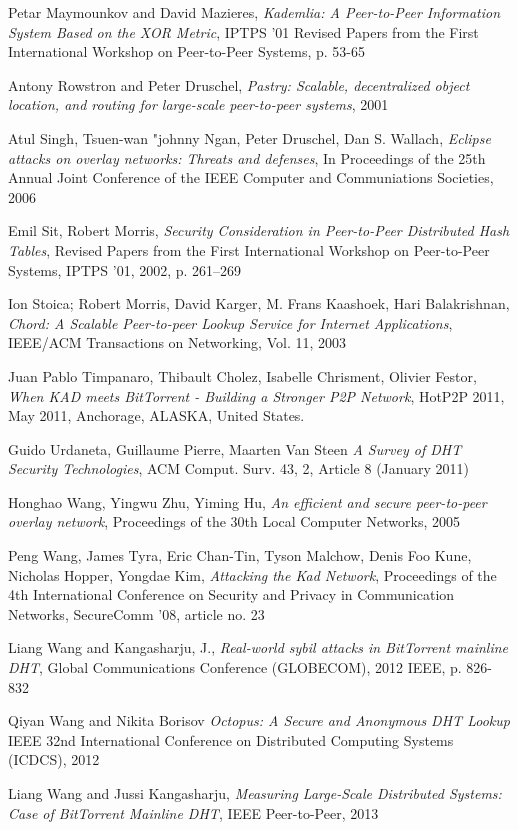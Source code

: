 \begin{thebibliography}{99}
  Petar Maymounkov and David Mazieres,
  \textit{Kademlia: A Peer-to-Peer Information System Based on the XOR Metric},
  IPTPS '01 Revised Papers from the First International Workshop on Peer-to-Peer
  Systems, p. 53-65

  Antony Rowstron and Peter Druschel,
  \textit{Pastry: Scalable, decentralized object location, and routing for
  large-scale peer-to-peer systems}, 2001

  Atul Singh, Tsuen-wan "johnny Ngan, Peter Druschel, Dan S. Wallach,
  \textit{Eclipse attacks on overlay networks: Threats and defenses},
  In Proceedings of the 25th Annual Joint Conference of the IEEE Computer and
  Communiations Societies, 2006

  Emil Sit, Robert Morris,
  \textit{Security Consideration in Peer-to-Peer Distributed Hash Tables},
  Revised Papers from the First International Workshop on Peer-to-Peer Systems,
  IPTPS '01, 2002, p. 261--269

  Ion Stoica; Robert Morris, David Karger, M. Frans Kaashoek, Hari Balakrishnan,
  \textit{Chord: A Scalable Peer-to-peer Lookup Service for Internet
  Applications},
  IEEE/ACM Transactions on Networking, Vol. 11, 2003

  Juan Pablo Timpanaro, Thibault Cholez, Isabelle Chrisment, Olivier Festor,
  \textit{When KAD meets BitTorrent - Building a Stronger P2P Network},
  HotP2P 2011, May 2011, Anchorage, ALASKA, United States.

 Guido Urdaneta, Guillaume Pierre, Maarten Van Steen
\textit{A Survey of DHT Security Technologies}, ACM Comput. Surv.  43, 2,
Article 8 (January 2011)

  Honghao Wang, Yingwu Zhu, Yiming Hu,
  \textit{An efficient and secure peer-to-peer overlay network}, 
  Proceedings of the 30th Local Computer Networks,
  2005

  Peng Wang, James Tyra, Eric Chan-Tin, Tyson Malchow, Denis Foo Kune, Nicholas
  Hopper, Yongdae Kim,
  \textit{Attacking the Kad Network},
  Proceedings of the 4th International Conference on Security and Privacy in
  Communication Networks, SecureComm '08, article no. 23

  Liang Wang and Kangasharju, J.,
  \textit{Real-world sybil attacks in BitTorrent mainline DHT},
  Global Communications Conference (GLOBECOM), 2012 IEEE, p. 826-832

   Qiyan Wang and Nikita Borisov
   \textit{Octopus: A Secure and Anonymous DHT Lookup}
   IEEE 32nd International Conference on Distributed Computing Systems (ICDCS), 2012

  Liang Wang and Jussi Kangasharju,
  \textit{Measuring Large-Scale Distributed Systems: Case of BitTorrent
  Mainline DHT}, 
  IEEE Peer-to-Peer, 2013
\end{thebibliography}


